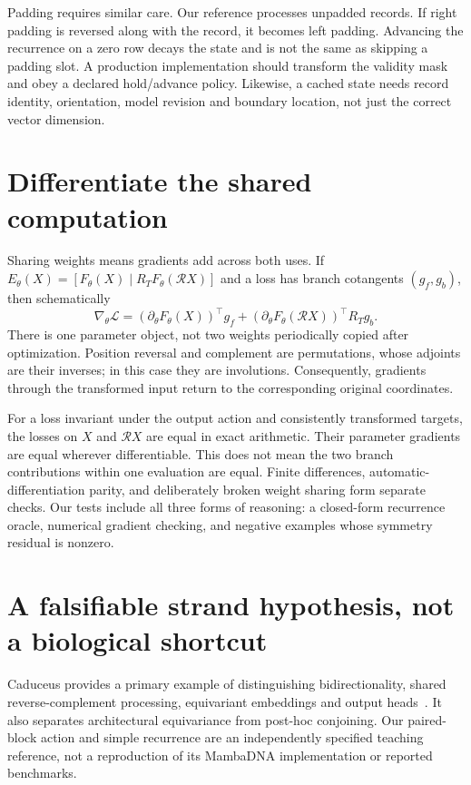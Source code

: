 Padding requires similar care. Our reference processes unpadded records.
If right padding is reversed along with the record, it becomes left padding.
Advancing the recurrence on a zero row decays the state and is not the same
as skipping a padding slot. A production implementation should transform the
validity mask and obey a declared hold/advance policy. Likewise, a cached
state needs record identity, orientation, model revision and boundary location,
not just the correct vector dimension.

\section{Differentiate the shared computation}

Sharing weights means gradients add across both uses. If
$E_\theta(X)=[F_\theta(X)\mid R_TF_\theta(\mathcal RX)]$ and a loss has branch
cotangents $(g_f,g_b)$, then schematically
\begin{equation}
 \nabla_\theta\mathcal L
 =(\partial_\theta F_\theta(X))^\top g_f+
  (\partial_\theta F_\theta(\mathcal RX))^\top R_Tg_b .
\end{equation}
There is one parameter object, not two weights periodically copied after
optimization. Position reversal and complement are permutations, whose
adjoints are their inverses; in this case they are involutions.
Consequently, gradients through the transformed input return to the
corresponding original coordinates.

For a loss invariant under the output action and consistently transformed
targets, the losses on $X$ and $\mathcal RX$ are equal in exact arithmetic.
Their parameter gradients are equal wherever differentiable. This does not
mean the two branch contributions within one evaluation are equal.
Finite differences, automatic-differentiation parity, and deliberately broken
weight sharing form separate checks. Our tests include all three forms of
reasoning: a closed-form recurrence oracle, numerical gradient checking, and
negative examples whose symmetry residual is nonzero.

\section{A falsifiable strand hypothesis, not a biological shortcut}

Caduceus provides a primary example of distinguishing bidirectionality,
shared reverse-complement processing, equivariant embeddings and output
heads~\cite{caduceus}. It also separates architectural equivariance from
post-hoc conjoining. Our paired-block action and simple recurrence are an
independently specified teaching reference, not a reproduction of its
MambaDNA implementation or reported benchmarks.

